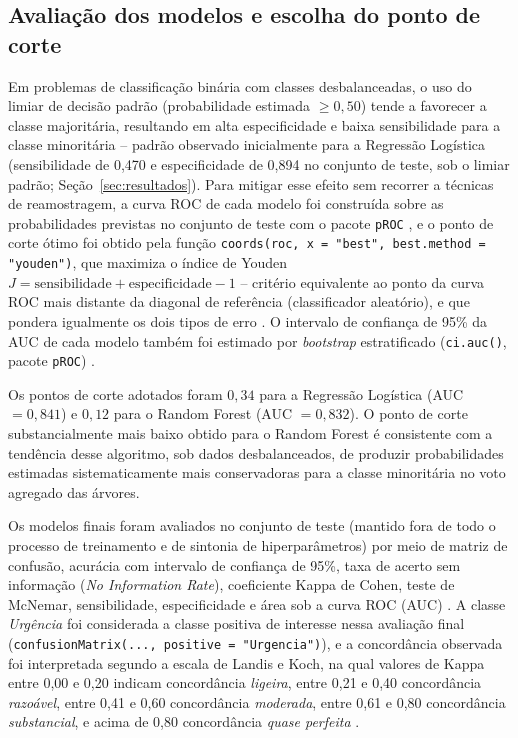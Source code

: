 \documentclass[12pt,a4paper]{article}
\begin{document}
\subsection{Avaliação dos modelos e escolha do ponto de corte}
\label{sec:corte}

Em problemas de classificação binária com classes desbalanceadas, o uso do limiar de decisão padrão (probabilidade estimada $\geq 0,50$) tende a favorecer a classe majoritária, resultando em alta especificidade e baixa sensibilidade para a classe minoritária -- padrão observado inicialmente para a Regressão Logística (sensibilidade de 0,470 e especificidade de 0,894 no conjunto de teste, sob o limiar padrão; Seção~\ref{sec:resultados}). Para mitigar esse efeito sem recorrer a técnicas de reamostragem, a curva ROC de cada modelo foi construída sobre as probabilidades previstas no conjunto de teste com o pacote \texttt{pROC} \cite{proc2011}, e o ponto de corte ótimo foi obtido pela função \texttt{coords(roc, x = "best", best.method = "youden")}, que maximiza o índice de Youden $J = \text{sensibilidade} + \text{especificidade} - 1$ \cite{youden1950} -- critério equivalente ao ponto da curva ROC mais distante da diagonal de referência (classificador aleatório), e que pondera igualmente os dois tipos de erro \cite{fawcett2006}. O intervalo de confiança de 95\% da AUC de cada modelo também foi estimado por \textit{bootstrap} estratificado (\texttt{ci.auc()}, pacote \texttt{pROC}) \cite{proc2011}.

Os pontos de corte adotados foram $0,34$ para a Regressão Logística (AUC $=0,841$) e $0,12$ para o Random Forest (AUC $=0,832$). O ponto de corte substancialmente mais baixo obtido para o Random Forest é consistente com a tendência desse algoritmo, sob dados desbalanceados, de produzir probabilidades estimadas sistematicamente mais conservadoras para a classe minoritária no voto agregado das árvores.

Os modelos finais foram avaliados no conjunto de teste (mantido fora de todo o processo de treinamento e de sintonia de hiperparâmetros) por meio de matriz de confusão, acurácia com intervalo de confiança de 95\%, taxa de acerto sem informação (\textit{No Information Rate}), coeficiente Kappa de Cohen, teste de McNemar, sensibilidade, especificidade e área sob a curva ROC (AUC) \cite{fawcett2006}. A classe \emph{Urgência} foi considerada a classe positiva de interesse nessa avaliação final (\texttt{confusionMatrix(..., positive = "Urgencia")}), e a concordância observada foi interpretada segundo a escala de Landis e Koch, na qual valores de Kappa entre 0,00 e 0,20 indicam concordância \emph{ligeira}, entre 0,21 e 0,40 concordância \emph{razoável}, entre 0,41 e 0,60 concordância \emph{moderada}, entre 0,61 e 0,80 concordância \emph{substancial}, e acima de 0,80 concordância \emph{quase perfeita} \cite{landis1977}.
\end{document}
